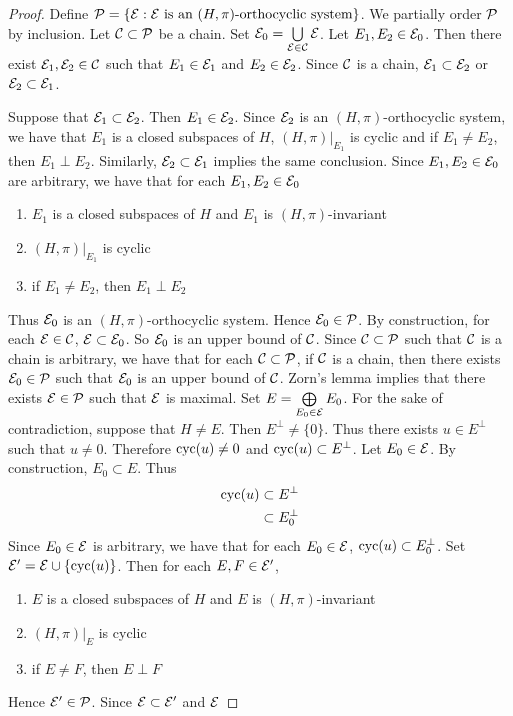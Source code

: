 \documentclass{book}
\begin{document}
	\begin{proof}
		Define $\mathcal{P} = \{\mathcal{E}: \text{$\mathcal{E}$ is an $(H, \pi)$-orthocyclic system}\}$. We partially order $\mathcal{P}$ by inclusion. Let $\mathcal{C} \subset \mathcal{P}$ be a chain. Set $\mathcal{E}_0 = \bigcup\limits_{\mathcal{E} \in \mathcal{C}} \mathcal{E}$. Let $E_1, E_2 \in \mathcal{E}_0$. Then there exist $\mathcal{E}_1, \mathcal{E}_2 \in \mathcal{C}$ such that $E_1 \in \mathcal{E}_1$ and $E_2 \in \mathcal{E}_2$. Since $\mathcal{C}$ is a chain, $\mathcal{E}_1 \subset \mathcal{E}_2$ or $\mathcal{E}_2 \subset \mathcal{E}_1$. 
		
		Suppose that $\mathcal{E}_1 \subset \mathcal{E}_2$. Then $E_1 \in \mathcal{E}_2$. Since $\mathcal{E}_2$ is an $(H, \pi)$-orthocyclic system, we have that $E_1$ is a closed subspaces of $H$, $(H, \pi)|_{E_1}$ is cyclic and if $E_1 \neq E_2$, then $E_1 \perp E_2$. Similarly, $\mathcal{E}_2 \subset \mathcal{E}_1$ implies the same conclusion. Since $E_1, E_2 \in \mathcal{E}_0$ are arbitrary, we have that for each $E_1, E_2 \in \mathcal{E}_0$ 
	 	\begin{enumerate}
	 		\item $E_1$ is a closed subspaces of $H$ and $E_1$ is $(H, \pi)$-invariant
	 		\item $(H, \pi)|_{E_1}$ is cyclic
	 		\item if $E_1 \neq E_2$, then $E_1 \perp E_2$
	 	\end{enumerate}
 	
 		Thus $\mathcal{E}_0$ is an $(H, \pi)$-orthocyclic system. Hence $\mathcal{E}_0 \in \mathcal{P}$. By construction, for each $\mathcal{E} \in \mathcal{C}$, $\mathcal{E} \subset \mathcal{E}_0$. So $\mathcal{E}_0$ is an upper bound of $\mathcal{C}$. Since $\mathcal{C} \subset \mathcal{P}$ such that $\mathcal{C}$ is a chain is arbitrary, we have that for each $\mathcal{C} \subset \mathcal{P}$, if $\mathcal{C}$ is a chain, then there exists $\mathcal{E}_0 \in \mathcal{P}$ such that $\mathcal{E}_0$ is an upper bound of $\mathcal{C}$. Zorn's lemma implies that there exists $\mathcal{E} \in \mathcal{P}$ such that $\mathcal{E}$ is maximal. Set $E =  \bigoplus\limits_{E_0 \in \mathcal{E}} E_0$. For the sake of contradiction, suppose that $H \neq E$. Then $E^{\perp} \neq \{0\}$. Thus there exists $u \in E^{\perp}$ such that $u \neq 0$. Therefore $\operatorname{cyc}(u) \neq 0$ and $\operatorname{cyc}(u) \subset E^{\perp}$. Let $E_0 \in \mathcal{E}$. By construction, $E_0 \subset E$. Thus
 		\begin{align*}
 			\operatorname{cyc}(u) 
 			& \subset E^{\perp} \\
 			& \subset E_0^{\perp}
 		\end{align*}
 		Since $E_0 \in \mathcal{E}$ is arbitrary, we have that for each $E_0 \in \mathcal{E}$, $\operatorname{cyc}(u) \subset E_0^{\perp}$. Set $\mathcal{E}' = \mathcal{E} \cup \{\operatorname{cyc}(u)\}$. Then for each $E,F \in \mathcal{E}'$, 
 		\begin{enumerate}
 			\item $E$ is a closed subspaces of $H$ and $E$ is $(H, \pi)$-invariant
 			\item $(H, \pi)|_{E}$ is cyclic
 			\item if $E \neq F$, then $E \perp F$
 		\end{enumerate}
 		Hence $\mathcal{E}' \in \mathcal{P}$. Since $\mathcal{E} \subset \mathcal{E}'$ and $\mathcal{E}$
	\end{proof}
\end{document}
